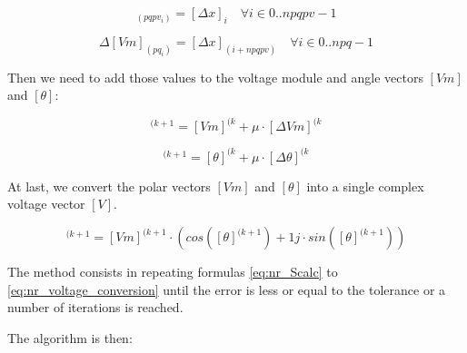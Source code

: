 \documentclass[nols,a4paper,twoside,notoc,fleqn]{tufte-book}
\begin{document}
\begin{equation}
[\Delta \theta]_{(pqpv_i)} = [\Delta x]_i  \quad \forall i \in {0..npqpv-1}
\label{eq:nr_dd1}
\end{equation}

\begin{equation}
\Delta  [Vm]_{(pq_i)} = [\Delta x]_{(i+npqpv)}  \quad \forall i \in {0..npq-1}
\end{equation}

Then we need to add those values to the voltage module and angle vectors $[Vm]$ and $[\theta]$:


\begin{equation}
[Vm]^{(k+1} = [Vm]^{(k} + \mu \cdot [\Delta Vm]^{(k}
\end{equation}

\begin{equation}
[\theta]^{(k+1} = [\theta]^{(k} +  \mu \cdot [\Delta \theta]^{(k}
\end{equation}


At last, we convert the polar vectors  $[Vm]$ and $[\theta]$ into a single complex voltage vector $[V]$.

\begin{equation}
[V]^{(k+1} = [Vm]^{(k+1} \cdot \left( cos([\theta]^{(k+1}) + 1j \cdot sin([\theta]^{(k+1})\right)
\label{eq:nr_voltage_conversion}
\end{equation}

The method consists in repeating formulas \ref{eq:nr_Scalc} to \ref{eq:nr_voltage_conversion} until the error is less or equal to the tolerance or a number of iterations is reached.

The algorithm is then:
\end{document}
